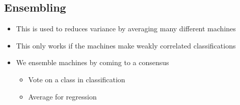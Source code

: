\documentclass[11pt]{article}
\begin{document}
\subsection{Ensembling}
\label{sec:org33fed2c}
\begin{itemize}
\item This is used to reduces variance by averaging many different machines
\item This only works if the machines make weakly correlated classifications
\item We ensemble machines by coming to a consensus
\begin{itemize}
\item Vote on a class in classification
\item Average for regression
\end{itemize}
\end{itemize}
\end{document}
